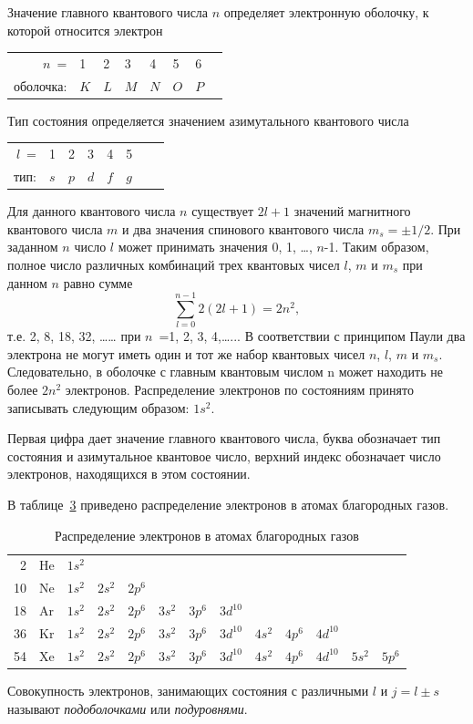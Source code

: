 \documentclass[a4paper,14pt, openany, twoside, draft]{extbook} %
\begin{document}
Значение главного квантового числа $n$ определяет электронную оболочку, к которой относится электрон
\begin{table}[hbt]
\begin{tabular}{rlllllll}
\label{tab:kvant}
$n$~= &1 &2 &3 &4 &5 &6 \\
оболочка: &$K$ &$L$ &$M$ &$N$ &$O$ &$P$ \\
\end{tabular}
\end{table}
Тип состояния определяется значением азимутального квантового числа \\
\begin{table}[hbt]
\begin{tabular}{rlllllll}
\label{tab:azimut}
$l$~= &1 &2 &3 &4 &5 \\
тип: &$s$ &$p$ &$d$ &$f$ &$g$ \\
\end{tabular}
\end{table}
Для данного квантового числа $n$ существует $2l+1$ значений магнитного квантового числа $m$ и два значения спинового квантового числа $m_s=\pm 1/2$.  При заданном $n$ число $l$ может принимать значения 0, 1, …, $n$-1.  Таким образом, полное число различных комбинаций трех квантовых чисел $l$, $m$ и $m_s$ при данном $n$ равно сумме
\begin{equation}
\label{eq:summquant}
\overset {n-1}{\underset{l=0}{\sum}}2(2l+1)=2n^2,
\end{equation}
т.е. 2, 8, 18, 32, …… при $n$~=1, 2, 3, 4,…...
В соответствии с принципом Паули два электрона не могут иметь один и тот же набор квантовых чисел  $n$, $l$, $m$ и $m_s.$ Следовательно, в оболочке с главным квантовым числом n может находить не более $2n^2$ электронов. Распределение электронов по состояниям принято записывать следующим образом: $1s^2$.

Первая цифра дает значение главного квантового числа, буква обозначает тип состояния и азимутальное квантовое число, верхний индекс обозначает число электронов, находящихся в этом состоянии.

В таблице~\ref{tab:spd} приведено распределение электронов в атомах благородных газов.
\begin{table}[hbt]
\caption{Распределение электронов в атомах благородных газов}
 \begin{tabular}{rllllllllllll} \label{tab:spd}
 2 &He &$1s^2$ \\
10 &Ne &$1s^2$ &$2s^2$ &$2p^6$ \\
18 &Ar &$1s^2$ &$2s^2$ &$2p^6$ &$3s^2$ &$3p^6$ &$3d^10$ \\
36 &Kr &$1s^2$ &$2s^2$ &$2p^6$ &$3s^2$ &$3p^6$ &$3d^10$ &$4s^2$ &$4p^6$ &$4d^10$ \\
54 &Xe &$1s^2$ &$2s^2$ &$2p^6$ &$3s^2$ &$3p^6$ &$3d^10$ &$4s^2$ &$4p^6$ &$4d^10$ &$5s^2$ &$5p^6$ \\
 \end{tabular}
\end{table}
Совокупность электронов, занимающих состояния с различными $l$ и $j=l\pm s$ называют \emph{подоболочками} или \emph{подуровнями}.
\end{document}
